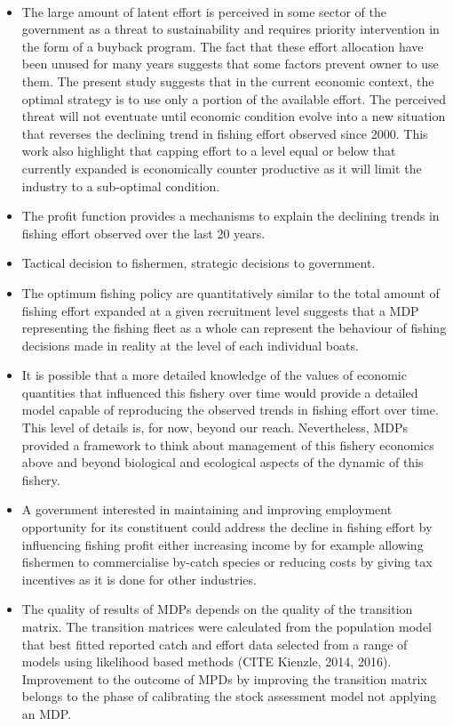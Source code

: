 \documentclass[11pt]{article}
\begin{document}
\\

\begin{itemize}
\item The large amount of latent effort is perceived in some sector of the government as a threat to sustainability and requires priority intervention in the form of a buyback program. The fact that these effort allocation have been unused for many years suggests that some factors prevent owner to use them. The present study suggests that in the current economic context, the optimal strategy is to use only a portion of the available effort. The perceived threat will not eventuate until economic condition evolve into a new situation that reverses the declining trend in fishing effort observed since 2000. This work also highlight that capping effort to a level equal or below that currently expanded is economically counter productive as it will limit the industry to a sub-optimal condition. 
\item The profit function provides a mechanisms to explain the declining trends in fishing effort observed over the last 20 years.
\item Tactical decision to fishermen, strategic decisions to government.

\item The optimum fishing policy are quantitatively similar to the total amount of fishing effort expanded at a given recruitment level suggests that a MDP representing the fishing fleet as a whole can represent the behaviour of fishing decisions made in reality at the level of each individual boats.
\item It is possible that a more detailed knowledge of the values of economic quantities that influenced this fishery over time would provide a detailed model capable of reproducing the observed trends in fishing effort over time. This level of details is, for now, beyond our reach. Nevertheless, MDPs provided a framework to think about management of this fishery economics above and beyond biological and ecological aspects of the dynamic of this fishery. 
\item A government interested in maintaining and improving employment opportunity for its constituent could address the decline in fishing effort by influencing fishing profit either increasing income by for example allowing fishermen to commercialise by-catch species or reducing costs by giving tax incentives as it is done for other industries. 

\item The quality of results of MDPs depends on the quality of the transition matrix. The transition matrices were calculated from the population model that best fitted reported catch and effort data selected from a range of models using likelihood based methods (CITE Kienzle, 2014, 2016). Improvement to the outcome of MPDs by improving the transition matrix belongs to the phase of calibrating the stock assessment model not applying an MDP.

\end{itemize}
\end{document}
